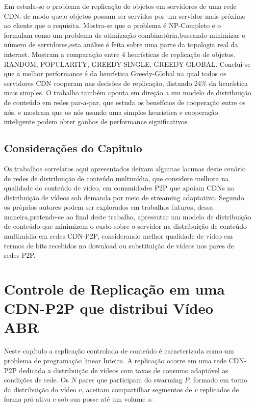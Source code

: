 \documentclass[
	12pt,
	oneside,
	a4paper,
	english,
	brazil
	]{abntex2ppgsi}
\begin{document}
Em \cite{Kangasharju2002}estuda-se o problema de replicação de objetos em servidores de uma rede CDN. de modo que,o objetos possam ser servidos por um servidor mais próximo ao cliente que o requisita. Mostra-se que o problema é NP-Completo e o formulam como um problema de otimização combinatória,buscando minimizar o número de servidores,esta análise  é feita sobre uma parte da topologia real da internet.
Mostram a comparação entre 4 heurísticas de replicação de objetos, RANDOM, POPULARITY, GREEDY-SINGLE, GREEDY-GLOBAL.
Conclui-se que a melhor performance é da heurística Greedy-Global na qual todos os servidores CDN cooperam nas decisões de replicação, distando 24\% da heurística mais simples.
O trabalho também aponta em direção a um modelo de distribuição de conteúdo em redes par-a-par, que estuda os benefícios de cooperação entre os nós, e mostram que os nós usando uma simples heurística e cooperação inteligente podem obter ganhos de performance significativos.


\section{Considerações do Capitulo}

Os trabalhos correlatos aqui apresentados deixam algumas lacunas deste cenário de redes de distribuição de conteúdo multimídia, que considere melhora na qualidade do conteúdo de vídeo, em comunidades P2P que apoiam CDNs na distribuição de vídeos sob demanda por meio de streaming adaptativo. Segundo os próprios autores podem ser explorados em trabalhos futuros, dessa maneira,pretende-se ao final deste trabalho, apresentar um modelo de distribuição de conteúdo que minimizem o custo sobre o servidor na distribuição de conteúdo multimídia em redes CDN-P2P, considerando melhor qualidade de vídeo em termos de bits recebidos no download ou substituição de vídeos nos pares de redes P2P.

\chapter{Controle de Replicação em uma CDN-P2P que distribui Vídeo ABR}

Neste capítulo a replicação controlada de conteúdo é caracterizada como um problema de programação linear Inteira. A replicação ocorre em uma rede CDN-P2P dedicada a distribuição de vídeos com taxas de consumo adaptável as condições de rede. Os $N$ pares que participam do swarming $P$, formado em torno da distribuição do vídeo $v$, aceitam compartilhar segmentos de $v$ replicados de forma pró ativa e sob sua posse até um volume $s$.
\end{document}
